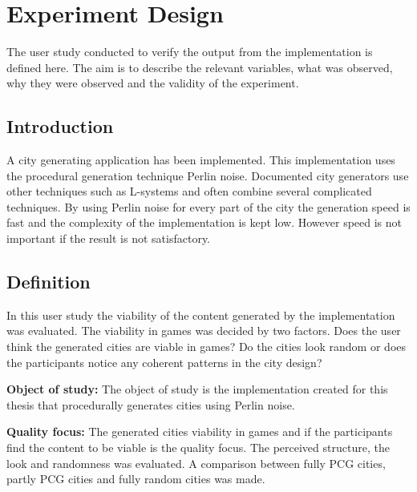	
\section{Experiment Design}
	The user study conducted to verify the output from the implementation is defined here. The aim is to describe the relevant variables, what was observed, why they were observed and the validity of the experiment.
	\subsection{Introduction}
	A city generating application has been implemented. This implementation uses the procedural generation technique Perlin noise. Documented city generators use other techniques such as L-systems and often combine several complicated techniques\cite{ProceduralModeling6}. By using Perlin noise for every part of the city the generation speed is fast and the complexity of the implementation is kept low. However speed is not important if the result is not satisfactory.
		
	\subsection{Definition}
	In this user study the viability of the content generated by the implementation was evaluated.  The viability in games was decided by two factors. Does the user think the generated cities are viable in games? Do the cities look random or does the participants notice any coherent patterns in the city design?
			
		
		
	\par
	\textbf{Object of study:}
	The object of study is the implementation created for this thesis that procedurally generates cities using Perlin noise.
			
	\par
	\textbf{Quality focus:}
	The generated cities viability in games and if the participants find the content to be viable is the quality focus. The perceived structure, the look and randomness was evaluated. A comparison between fully PCG cities, partly PCG cities and fully random cities was made.
			
